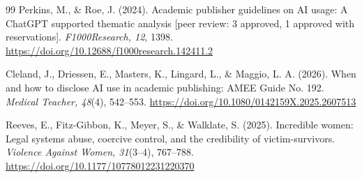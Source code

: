 \documentclass[11pt, letterpaper]{article}
\begin{document}
\begin{thebibliography}{99}
Perkins, M., \& Roe, J. (2024).
Academic publisher guidelines on AI usage: A ChatGPT supported thematic analysis [peer review: 3 approved, 1 approved with reservations].
\textit{F1000Research, 12}, 1398.
\url{https://doi.org/10.12688/f1000research.142411.2}

Cleland, J., Driessen, E., Masters, K., Lingard, L., \& Maggio, L. A. (2026).
When and how to disclose AI use in academic publishing: AMEE Guide No. 192.
\textit{Medical Teacher, 48}(4), 542--553.
\url{https://doi.org/10.1080/0142159X.2025.2607513}

Reeves, E., Fitz-Gibbon, K., Meyer, S., \& Walklate, S. (2025).
Incredible women: Legal systems abuse, coercive control, and the credibility of victim-survivors.
\textit{Violence Against Women, 31}(3--4), 767--788.
\url{https://doi.org/10.1177/10778012231220370}

\end{thebibliography}
\end{document}
